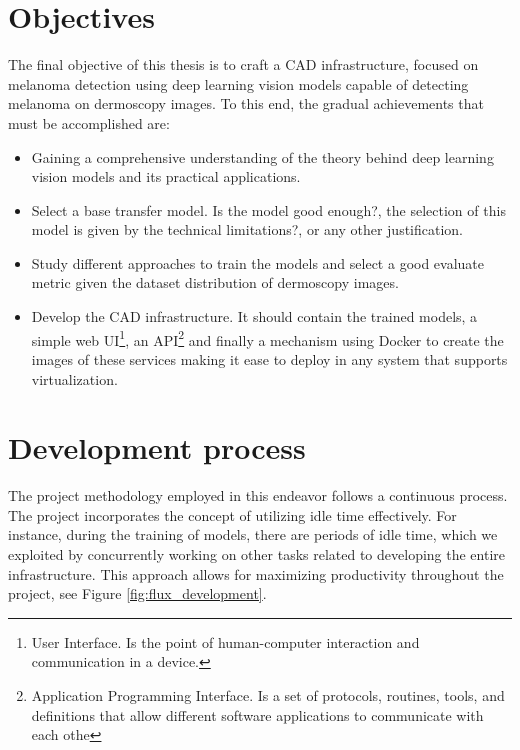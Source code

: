 \newpage

\section{Objectives}

The final objective of this thesis is to craft a CAD infrastructure, focused on
melanoma detection using deep learning vision models capable of detecting
melanoma on dermoscopy images. To this end, the gradual achievements that must
be accomplished are:

\begin{itemize}

  \item Gaining a comprehensive understanding of the theory behind deep
    learning vision models and its practical applications.

   \item Select a base transfer model. Is the model good enough?, the selection
     of this model is given by the technical limitations?, or any other
     justification.

  \item Study different approaches to train the models and select a good
    evaluate metric given the dataset distribution of dermoscopy images.

  \item  Develop the CAD infrastructure. It should contain the  trained models,
    a simple web UI\footnote{User Interface. Is the point of human-computer
    interaction and communication in a device.}, an API\footnote{Application
      Programming Interface. Is a set of protocols, routines, tools, and
    definitions that allow different software applications to communicate with
  each othe} and finally a mechanism using Docker to create the images of these
  services making it ease to deploy in any system that supports virtualization.

\end{itemize}


\section{Development process}

The project methodology employed in this endeavor follows a continuous process.
The project incorporates the concept of utilizing idle time effectively. For
instance, during the training of models, there are periods of idle time, which
we exploited by concurrently working on other tasks related to developing the
entire infrastructure. This approach allows for maximizing productivity
throughout the project, see Figure \ref{fig:flux_development}.

